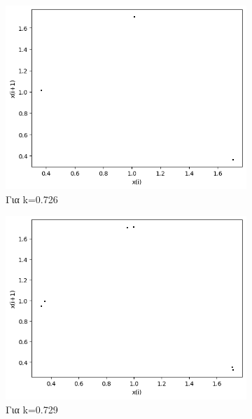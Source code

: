\begin{figure}[h!]
\begin{subfigure}[b]{0.25\textwidth}
		\includegraphics[width=\textwidth]{LateX images/graphs q12/g9}
		\caption{Για k=0.726}
		\label{f:k65}
	\end{subfigure}
	\hfill
	\begin{subfigure}[b]{0.25\textwidth}
		\centering
		\includegraphics[width=\textwidth]{LateX images/graphs q12/g10}
		\caption{Για k=0.729}
		\label{f:k66}
	\end{subfigure}
	\hfill
	\begin{subfigure}[b]{0.25\textwidth}
		\centering

\end{subfigure}
\end{figure}
